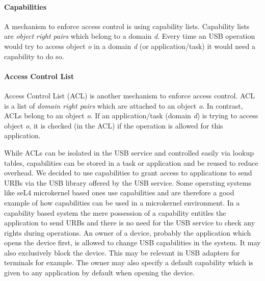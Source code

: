 \documentclass{acm_proc_article-sp}
\begin{document}
\paragraph{Capabilities}
A mechanism to enforce access control is using capability lists.
Capability lists are \emph{object right pairs} which belong to a domain \emph{d}.
Every time an USB operation would try to access object \emph{o} in a domain \emph{d} (or application/task)
it would need a capability to do so.

\paragraph{Access Control List}
Access Control List (ACL) is another mechanism to enforce access control.
ACL is a list of \emph{domain right pairs} which are attached to an object \emph{o}.
In contrast, ACLs belong to an object \emph{o}.
If an application/task (domain \emph{d}) is trying to access object \emph{o}, it is checked
(in the ACL) if the operation is allowed for this application.

While ACLs can be isolated in the USB service and controlled easily via lookup tables,
capabilities can be stored in a task or application and be reused to reduce overhead.
We decided to use capabilities to grant access to applications to send URBs
via the USB library offered by the USB service.
Some operating systems like seL4 microkernel based ones \cite{sel4} use capabilities
and are therefore a good example of how capabilities can be used in a microkernel
environment.
In a capability based system the mere possession of a capability entitles
the application to send URBs and there is no need for the USB service to
check any rights during operations.
An owner of a device, probably the application which opens the device first,
is allowed to change USB capabilities in the system.
It may also exclusively block the device.
This may be relevant in USB adapters for terminals for example.
The owner may also specify a default capability which is given to any
application by default when opening the device.
\end{document}
